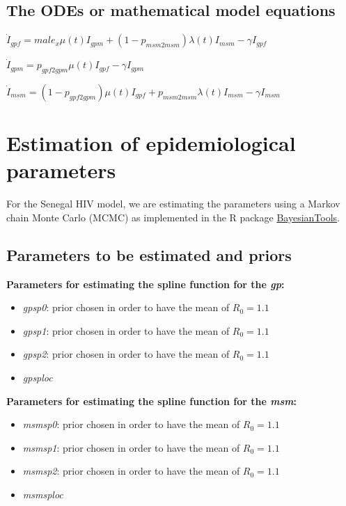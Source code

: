 \documentclass[12pt,]{article}
\providecommand{\tightlist}{%
  \setlength{\itemsep}{0pt}\setlength{\parskip}{0pt}}
\begin{document}
\hypertarget{the-odes-or-mathematical-model-equations}{%
\subsection{The ODEs or mathematical model
equations}\label{the-odes-or-mathematical-model-equations}}

\(\dot{I}_{gpf} = male_x \mu(t) I_{gpm} + (1 - p_{msm2msm}) \lambda(t) I_{msm} - \gamma I_{gpf}\)

\(\dot{I}_{gpm} = p_{gpf2gpm} \mu(t) I_{gpf} - \gamma I_{gpm}\)

\(\dot{I}_{msm} = (1 - p_{gpf2gpm}) \mu(t) I_{gpf} + p_{msm2msm} \lambda(t) I_{msm} - \gamma I_{msm}\)

\hypertarget{estimation-of-epidemiological-parameters}{%
\section{Estimation of epidemiological
parameters}\label{estimation-of-epidemiological-parameters}}

For the Senegal HIV model, we are estimating the parameters using a
Markov chain Monte Carlo (MCMC) as implemented in the R package
\href{\%22https://github.com/florianhartig/BayesianTools\%22}{BayesianTools}.

\hypertarget{parameters-to-be-estimated-and-priors}{%
\subsection{Parameters to be estimated and
priors}\label{parameters-to-be-estimated-and-priors}}

\textbf{Parameters for estimating the spline function for the
\emph{gp}:}

\begin{itemize}
\tightlist
\item
  \emph{gpsp0}: prior chosen in order to have the mean of \(R_0 = 1.1\)
\item
  \emph{gpsp1}: prior chosen in order to have the mean of \(R_0 = 1.1\)
\item
  \emph{gpsp2}: prior chosen in order to have the mean of \(R_0 = 1.1\)
\item
  \emph{gpsploc}
\end{itemize}

\textbf{Parameters for estimating the spline function for the
\emph{msm}:}

\begin{itemize}
\tightlist
\item
  \emph{msmsp0}: prior chosen in order to have the mean of \(R_0 = 1.1\)
\item
  \emph{msmsp1}: prior chosen in order to have the mean of \(R_0 = 1.1\)
\item
  \emph{msmsp2}: prior chosen in order to have the mean of \(R_0 = 1.1\)
\item
  \emph{msmsploc}
\end{itemize}
\end{document}
